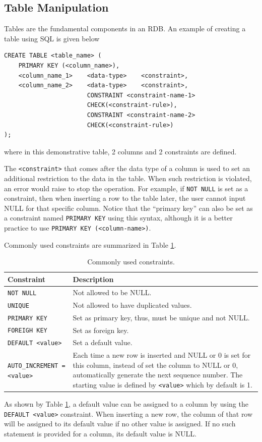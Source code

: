 \subsection{Table Manipulation}

Tables are the fundamental components in an RDB. An example of creating a table using SQL is given below
\begin{lstlisting}
CREATE TABLE <table_name> (
    PRIMARY KEY (<column_name>),
    <column_name_1>    <data-type>    <constraint>,
    <column_name_2>    <data-type>    <constraint>,
                       CONSTRAINT <constraint-name-1>
                       CHECK(<constraint-rule>),
                       CONSTRAINT <constraint-name-2>
                       CHECK(<constraint-rule>)
);
\end{lstlisting}
where in this demonstrative table, 2 columns and 2 constraints are defined.

The \verb|<constraint>| that comes after the data type of a column is used to set an additional restriction to the data in the table. When such restriction is violated, an error would raise to stop the operation. For example, if \verb|NOT NULL| is set as a constraint, then when inserting a row to the table later, the user cannot input NULL for that specific column. Notice that the ``primary key'' can also be set as a constraint named \verb|PRIMARY KEY| using this syntax, although it is a better practice to use \verb|PRIMARY KEY (<column-name>)|.

Commonly used constraints are summarized in Table \ref{ch:db:tab:constraints}.
\begin{table}[!htb]
	\centering \caption{Commonly used constraints.}\label{ch:db:tab:constraints}
	\begin{tabularx}{\textwidth}{lX}
		\hline
		Constraint & Description \\ \hline
		\verb|NOT NULL| & Not allowed to be NULL. \\ 
		\verb|UNIQUE| & Not allowed to have duplicated values. \\ 
        \verb|PRIMARY KEY| & Set as primary key, thus, must be unique and not NULL. \\ 
        \verb|FOREIGH KEY| & Set as foreign key. \\ 
        \verb|DEFAULT <value>| & Set a default value. \\ 
        \verb|AUTO_INCREMENT = <value>| & Each time a new row is inserted and NULL or 0 is set for this column, instead of set the column to NULL or 0, automatically generate the next sequence number. The starting value is defined by \verb|<value>| which by default is 1. \\
		 \hline
	\end{tabularx}
\end{table}
As shown by Table \ref{ch:db:tab:constraints}, a default value can be assigned to a column by using the \verb|DEFAULT <value>| constraint. When inserting a new row, the column of that row will be assigned to its default value if no other value is assigned. If no such statement is provided for a column, its default value is NULL.

